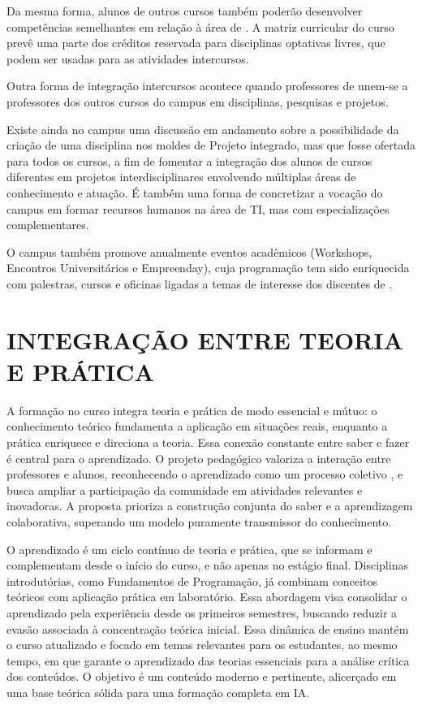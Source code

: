 Da mesma forma, alunos de outros cursos também poderão desenvolver competências semelhantes em relação à área de \nomedocurso. A matriz curricular do curso prevê uma parte dos créditos reservada para disciplinas optativas livres, que podem ser usadas para as atividades intercursos.

Outra forma de integração intercursos acontece quando professores de \nomedocurso unem-se a professores dos outros cursos do campus em disciplinas, pesquisas e projetos.

Existe ainda no campus uma discussão em andamento sobre a possibilidade da criação de uma disciplina nos moldes de Projeto integrado, mas que fosse ofertada para todos os cursos, a fim de fomentar a integração dos alunos de cursos diferentes em projetos interdisciplinares envolvendo múltiplas áreas de conhecimento e atuação. É também uma forma de concretizar a vocação do campus em formar recursos humanos na área de TI, mas com especializações complementares.

O campus também promove anualmente eventos acadêmicos (Workshops, Encontros Universitários e Empreenday), cuja programação tem sido enriquecida com palestras, cursos e oficinas ligadas a temas de interesse dos discentes de \nomedocurso.

\section{INTEGRAÇÃO ENTRE TEORIA E PRÁTICA}

A formação no curso integra teoria e prática de modo essencial e mútuo: o conhecimento teórico fundamenta a aplicação em situações reais, enquanto a prática enriquece e direciona a teoria. Essa conexão constante entre saber e fazer é central para o aprendizado.
%
O projeto pedagógico valoriza a interação entre professores e alunos, reconhecendo o aprendizado como um processo coletivo \cite{morin2016sete}, e busca ampliar a participação da comunidade em atividades relevantes e inovadoras. A proposta prioriza a construção conjunta do saber e a aprendizagem colaborativa, superando um modelo puramente transmissor do conhecimento.

O aprendizado é um ciclo contínuo de teoria e prática, que se informam e complementam desde o início do curso, e não apenas no estágio final. Disciplinas introdutórias, como Fundamentos de Programação, já combinam conceitos teóricos com aplicação prática em laboratório. Essa abordagem visa consolidar o aprendizado pela experiência desde os primeiros semestres, buscando reduzir a evasão associada à concentração teórica inicial.
%
Essa dinâmica de ensino mantém o curso atualizado e focado em temas relevantes para os estudantes, ao mesmo tempo, em que garante o aprendizado das teorias essenciais para a análise crítica dos conteúdos. O objetivo é um conteúdo moderno e pertinente, alicerçado em uma base teórica sólida para uma formação completa em IA.

